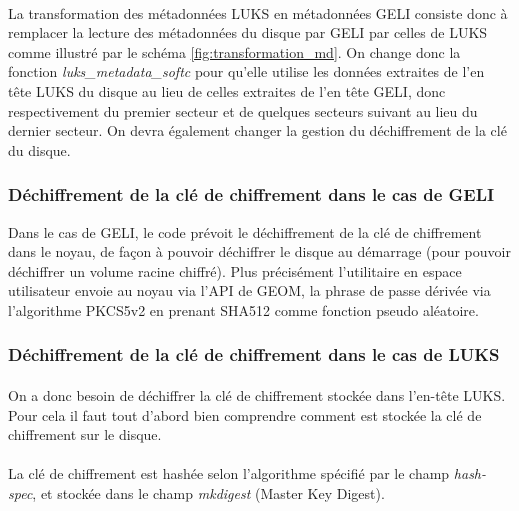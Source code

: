 \paragraph{}
La transformation des métadonnées LUKS en métadonnées GELI consiste donc à 
remplacer la lecture des métadonnées du disque par GELI par celles de LUKS 
comme illustré par le schéma \ref{fig:transformation_md}. On change donc la 
fonction {\em luks\_metadata\_softc} pour qu'elle utilise les données extraites
de l'en tête LUKS du disque au lieu de celles extraites de l'en tête GELI, donc
respectivement du premier secteur et de quelques secteurs suivant au lieu du 
dernier secteur. On devra également changer la gestion du déchiffrement de la 
clé du disque.


\subsubsection{Déchiffrement de la clé de chiffrement dans le cas de GELI}
Dans le cas de GELI, le code prévoit le déchiffrement de la clé de chiffrement 
dans le noyau, de façon à pouvoir déchiffrer le disque au démarrage (pour 
pouvoir déchiffrer un volume racine chiffré). Plus précisément l'utilitaire en espace
utilisateur envoie au noyau via l'API de GEOM, la phrase de passe dérivée via
l'algorithme PKCS5v2 en prenant SHA512 comme fonction pseudo aléatoire.


\subsubsection{Déchiffrement de la clé de chiffrement dans le cas de LUKS}
\label{sub:dechif_cle}
\paragraph{}
On a donc besoin de déchiffrer la clé de chiffrement stockée dans l'en-tête LUKS.
Pour cela il faut tout d'abord bien comprendre comment est stockée la clé de 
chiffrement sur le disque.

\paragraph{}
La clé de chiffrement est hashée selon l'algorithme spécifié par le champ
{\em hash-spec}, et stockée dans le champ {\em mkdigest} (Master Key Digest).

